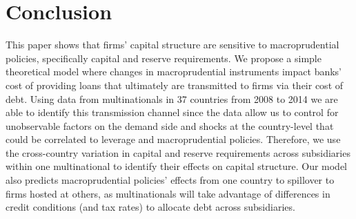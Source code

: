 \documentclass[12pt]{article}
\begin{document}
	\begin{small}
	{
		
	}
\end{small}
	
	


	\section{Conclusion} \label{sec:conclusion}
		
	This paper shows that firms' capital structure are sensitive to macroprudential policies, specifically capital and reserve requirements. We propose a simple theoretical model  where changes in macroprudential instruments impact banks' cost of providing loans that ultimately are transmitted to firms via their cost of debt. Using data from multinationals in 37 countries from 2008 to 2014 we are able to identify this transmission channel since the data allow us to control for unobservable factors on the demand side and shocks at the country-level that could be correlated to leverage and macroprudential policies. Therefore, we use the cross-country variation in capital and reserve requirements across subsidiaries within one multinational to identify their effects on capital structure. Our model also predicts macroprudential policies' effects from one country to spillover to firms hosted at others, as multinationals will take advantage of differences in credit conditions (and tax rates) to allocate debt across subsidiaries. 
	
\end{document}

